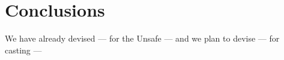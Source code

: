 
\chapter{Conclusions}


We have already devised --- for the \java{} Unsafe \api{} --- and
we plan to devise --- for casting ---